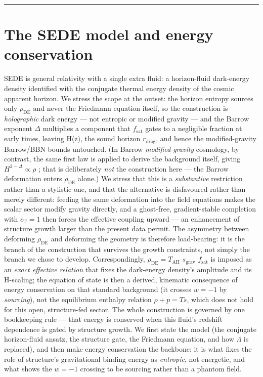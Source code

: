 \documentclass[preprint,12pt]{elsarticle}
\begin{document}
\begin{center}\rule{0.5\linewidth}{0.5pt}\end{center}

\section{The SEDE model and energy conservation}\label{sec-2}

SEDE is general relativity with a single extra fluid: a horizon-fluid
dark-energy density identified with the conjugate thermal energy density
of the cosmic apparent horizon. We stress the scope at the outset: the
horizon entropy sources only \(\rho _\mathrm{DE}\) and never the
Friedmann equation itself, so the construction is \emph{holographic}
dark energy --- not entropic or modified gravity --- and the Barrow
exponent \(\Delta\) multiplies a component that \(f_{\mathrm{sat}}\)
gates to a negligible fraction at early times, leaving H(z), the sound
horizon \(r_{\mathrm{drag}}\), and hence the modified-gravity Barrow/BBN
bounds untouched. (In Barrow \emph{modified-gravity} cosmology, by
contrast, the same first law is applied to derive the background itself,
giving \(H^{2-\Delta } \propto  \rho\) \citep{Saridakis:2020zol}; that
is deliberately \emph{not} the construction here --- the Barrow
deformation enters \(\rho _\mathrm{DE}\) alone.) We stress that this is
a \emph{substantive} restriction rather than a stylistic one, and that
the alternative is disfavoured rather than merely different: feeding the
same deformation into the field equations makes the scalar sector modify
gravity directly, and a ghost-free, gradient-stable completion with
\(c_{\mathrm{T}} = 1\) then forces the effective coupling upward --- an
enhancement of structure growth larger than the present data permit. The
asymmetry between deforming \(\rho _\mathrm{DE}\) and deforming the
geometry is therefore load-bearing: it is the branch of the construction
that survives the growth constraints, not simply the branch we chose to
develop. Correspondingly, \(\rho _\mathrm{DE} = T_\mathrm{AH}\)
\(s_{\mathrm{grav}}\) \(f_{\mathrm{sat}}\) is imposed as an \emph{exact
effective relation} that fixes the dark-energy density's amplitude and
its H-scaling; the equation of state is then a derived, kinematic
consequence of energy conservation on that standard background (it
crosses \(w = -1\) by \emph{sourcing}), not the equilibrium enthalpy
relation \(\rho  + p = Ts\), which does not hold for this open,
structure-fed sector. The whole construction is governed by one
bookkeeping rule --- that energy is conserved when this fluid's redshift
dependence is gated by structure growth. We first state the model (the
conjugate horizon-fluid ansatz, the structure gate, the Friedmann
equation, and how \(\Lambda\) is replaced), and then make energy
conservation the backbone: it is what fixes the role of structure's
gravitational binding energy as \emph{entropic}, not energetic, and what
shows the \(w = -1\) crossing to be sourcing rather than a phantom
field.
\end{document}
